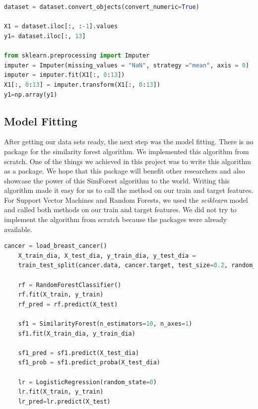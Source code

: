 \documentclass{article}
\begin{document}
\begin{lstlisting}[caption={Preprocessing code},label={lst:label},language=python]


dataset = dataset.convert_objects(convert_numeric=True)

X1 = dataset.iloc[:, :-1].values
y1= dataset.iloc[:, 13]

from sklearn.preprocessing import Imputer
imputer = Imputer(missing_values = "NaN", strategy ="mean", axis = 0)
imputer = imputer.fit(X1[:, 0:13])   
X1[:, 0:13] = imputer.transform(X1[:, 0:13])
y1=np.array(y1)
\end{lstlisting}
\subsection{Model Fitting}
After getting our data sets ready, the next step was the model fitting. There is no package for the similarity forest algorithm. We implemented this algorithm from scratch. One of the things we achieved in this project was to write this algorithm as a package. We hope that this package will benefit other researchers and also showcase the power of this SimForest algorithm to the world. Writing this algorithm made it easy for us to call the method on our train and target features.\\

\noindent For Support Vector Machines and Random Forests, we used the \textit{sciklearn} model and called both methods on our train and target features. We did not try to implement the algorithm from scratch because the packages were already available.

\begin{lstlisting}[caption={Model Fitting code},label={lst:label},language=python]
 cancer = load_breast_cancer() 
    X_train_dia, X_test_dia, y_train_dia, y_test_dia = 
    train_test_split(cancer.data, cancer.target, test_size=0.2, random_state=0)
    
    rf = RandomForestClassifier()
    rf.fit(X_train, y_train)
    rf_pred = rf.predict(X_test)
    
    sf1 = SimilarityForest(n_estimators=10, n_axes=1)
    sf1.fit(X_train_dia, y_train_dia)

    sf1_pred = sf1.predict(X_test_dia)
    sf1_prob = sf1.predict_proba(X_test_dia)
    
    lr = LogisticRegression(random_state=0)
    lr.fit(X_train, y_train)
    lr_pred=lr.predict(X_test)
    
\end{lstlisting}
\end{document}
